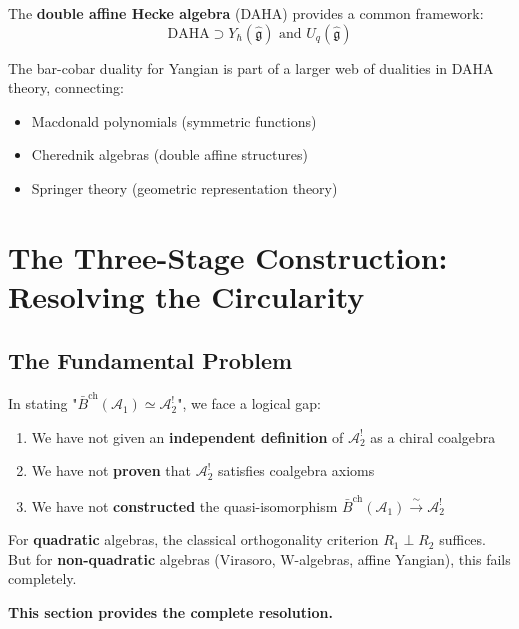 \begin{remark}
The \textbf{double affine Hecke algebra} (DAHA) provides a common framework:
$$\text{DAHA} \supset Y_{\hbar}(\widehat{\mathfrak{g}}) \text{ and } U_q(\widehat{\mathfrak{g}})$$

The bar-cobar duality for Yangian is part of a larger web of dualities in DAHA 
theory, connecting:
\begin{itemize}
\item Macdonald polynomials (symmetric functions)
\item Cherednik algebras (double affine structures)
\item Springer theory (geometric representation theory)
\end{itemize}
\end{remark}


\section{The Three-Stage Construction: Resolving the Circularity}
\label{sec:three-stage-construction}

\subsection{The Fundamental Problem}

\begin{problem}\label{prob:circularity}
In stating "$\bar{B}^{\text{ch}}(\mathcal{A}_1) \simeq \mathcal{A}_2^!$", we face a logical gap:
\begin{enumerate}
\item We have not given an \textbf{independent definition} of $\mathcal{A}_2^!$ as a chiral coalgebra
\item We have not \textbf{proven} that $\mathcal{A}_2^!$ satisfies coalgebra axioms
\item We have not \textbf{constructed} the quasi-isomorphism $\bar{B}^{\text{ch}}(\mathcal{A}_1) \xrightarrow{\sim} \mathcal{A}_2^!$
\end{enumerate}

For \textbf{quadratic} algebras, the classical orthogonality criterion $R_1 \perp R_2$ suffices. But for \textbf{non-quadratic} algebras (Virasoro, W-algebras, affine Yangian), this fails completely.

\textbf{This section provides the complete resolution.}
\end{problem}

